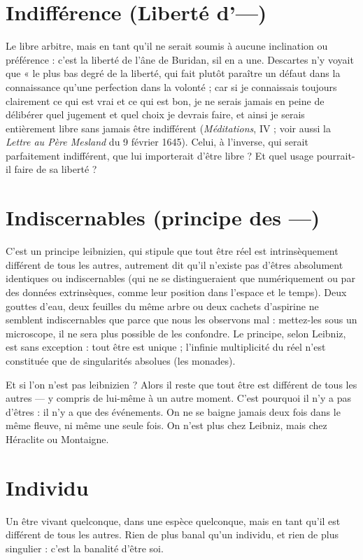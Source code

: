 \section{Indifférence (Liberté d'—)}
Le libre arbitre, mais en tant qu’il ne
serait soumis à aucune inclination ou
préférence : c’est la liberté de l’âne de Buridan, sil en a une. Descartes n’y
voyait que « le plus bas degré de la liberté, qui fait plutôt paraître un défaut
dans la connaissance qu’une perfection dans la volonté ; car si je connaissais
toujours clairement ce qui est vrai et ce qui est bon, je ne serais jamais en peine
de délibérer quel jugement et quel choix je devrais faire, et ainsi je serais entièrement
libre sans jamais être indifférent ({\it Méditations}, IV ; voir aussi la {\it Lettre au
Père Mesland} du 9 février 1645). Celui, à l'inverse, qui serait parfaitement
indifférent, que lui importerait d’être libre ? Et quel usage pourrait-il faire de sa
liberté ?

\section{Indiscernables (principe des —)}
C’est un principe leibnizien, qui
stipule que tout être réel est
intrinsèquement différent de tous les autres, autrement dit qu’il n’existe pas
d’êtres absolument identiques ou indiscernables (qui ne se distingueraient que
numériquement ou par des données extrinsèques, comme leur position dans
l’espace et le temps). Deux gouttes d’eau, deux feuilles du même arbre ou deux
cachets d’aspirine ne semblent indiscernables que parce que nous les observons
mal : mettez-les sous un microscope, il ne sera plus possible de les confondre.
Le principe, selon Leibniz, est sans exception : tout être est unique ; l’infinie
multiplicité du réel n’est constituée que de singularités absolues (les monades).

Et si l’on n’est pas leibnizien ? Alors il reste que tout être est différent de
tous les autres — y compris de lui-même à un autre moment. C’est pourquoi il
n’y a pas d'êtres : il n’y a que des événements. On ne se baigne jamais deux fois
dans le même fleuve, ni même une seule fois. On n’est plus chez Leibniz, mais
chez Héraclite ou Montaigne.

\section{Individu}
Un être vivant quelconque, dans une espèce quelconque, mais
en tant qu'il est différent de tous les autres. Rien de plus banal
qu’un individu, et rien de plus singulier : c’est la banalité d’être soi.


